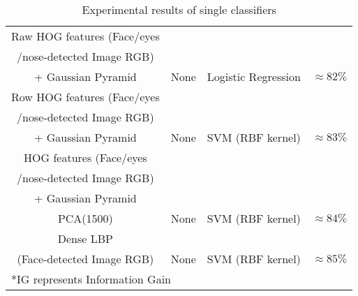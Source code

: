 \begin{table}[h!]
\begin{tabular*}{\textwidth}{c @{\extracolsep{\fill}}ccc}
Raw HOG features (Face/eyes & & & \\ 
/nose-detected Image RGB) & & &\\ 
+ Gaussian Pyramid & None & Logistic Regression & $\approx 82\%$  \\ \hline
Row HOG features (Face/eyes & & &\\
/nose-detected Image RGB) & & & \\ 
+ Gaussian Pyramid & None &  SVM (RBF kernel) & $\approx 83\%$  \\ \hline
HOG features (Face/eyes & & &\\
/nose-detected Image RGB) & & & \\ 
+ Gaussian Pyramid & & &\\
PCA(1500) & None &  SVM (RBF kernel) & $\approx 84\%$  \\ \hline
Dense LBP  & & & \\
(Face-detected Image RGB) & None & SVM (RBF kernel) & $\approx 85\%$  \\ 
\hline
\multicolumn{4}{l}{*IG represents Information Gain} \\
\hline
\end{tabular*}
\caption{Experimental results of single classifiers}
\label{Table 1}
\end{table}

